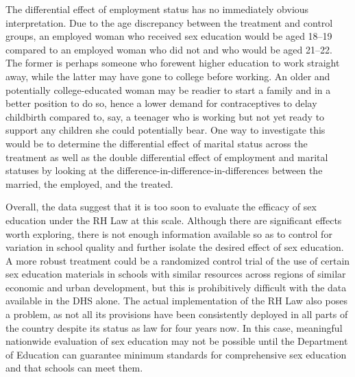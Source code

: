 \documentclass[12pt]{article}
\begin{document}
The differential effect of employment status has no immediately obvious interpretation.
Due to the age discrepancy between the treatment and control groups, an employed woman who received sex education would be aged 18--19 compared to an employed woman who did not and who would be aged 21--22.
The former is perhaps someone who forewent higher education to work straight away, while the latter may have gone to college before working.
An older and potentially college-educated woman may be readier to start a family and in a better position to do so, hence a lower demand for contraceptives to delay childbirth compared to, say, a teenager who is working but not yet ready to support any children she could potentially bear.
One way to investigate this would be to determine the differential effect of marital status across the treatment as well as the double differential effect of employment and marital statuses by looking at the difference-in-difference-in-differences between the married, the employed, and the treated.

Overall, the data suggest that it is too soon to evaluate the efficacy of sex education under the RH Law at this scale.
Although there are significant effects worth exploring, there is not enough information available so as to control for variation in school quality and further isolate the desired effect of sex education.
A more robust treatment could be a randomized control trial of the use of certain sex education materials in schools with similar resources across regions of similar economic and urban development, but this is prohibitively difficult with the data available in the DHS alone.
The actual implementation of the RH Law also poses a problem, as not all its provisions have been consistently deployed in all parts of the country despite its status as law for four years now.
In this case, meaningful nationwide evaluation of sex education may not be possible until the Department of Education can guarantee minimum standards for comprehensive sex education and that schools can meet them.
\end{document}
